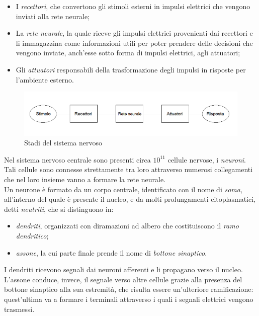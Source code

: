\documentclass[12pt,a4paper,oneside]{book}
\begin{document}
		\begin{itemize}
			\item I \emph{recettori}, che convertono gli stimoli esterni in impulsi elettrici che vengono inviati alla rete neurale;
			\item La \emph{rete neurale}, la quale riceve gli impulsi elettrici provenienti dai recettori e li immagazzina come informazioni utili per poter prendere delle decisioni che vengono inviate, anch'esse sotto forma di impulsi elettrici, agli attuatori;
			\item Gli \emph{attuatori} responsabili della trasformazione degli impulsi in risposte per l'ambiente esterno.
		\end{itemize}
	
		\begin{figure}[h]
		\centering
		\includegraphics[width=1\linewidth]{IMMAGINI/Sistemanervoso}
		\caption{Stadi del sistema nervoso}
		\label{fig: stadi sistema nervoso}
		\end{figure}
		
		Nel sistema nervoso centrale sono presenti circa $10^{11}$ cellule nervose, i \emph{neuroni}. Tali cellule sono connesse strettamente tra loro attraverso numerosi collegamenti che nel loro insieme vanno a formare la rete neurale. \\
		Un neurone è formato da un corpo centrale, identificato con il nome di \emph{soma}, all'interno del quale è presente il nucleo, e da molti prolungamenti citoplasmatici, detti \emph{neutriti}, che si distinguono in:
		 
		 \begin{itemize}
		 	\item \emph{dendriti}, organizzati con diramazioni ad albero che costituiscono il \emph{ramo dendritico};
		 	\item \emph{assone}, la cui parte finale prende il nome di \emph{bottone sinaptico}.
		 \end{itemize}
		 
		 I dendriti ricevono segnali dai neuroni afferenti e li propagano verso il nucleo. L'assone conduce, invece, il segnale verso altre cellule grazie alla presenza del bottone sinaptico alla sua estremità, che risulta essere un'ulteriore ramificazione: quest'ultima va a formare i terminali attraverso i quali i segnali elettrici vengono trasmessi.\\
		 
\end{document}
